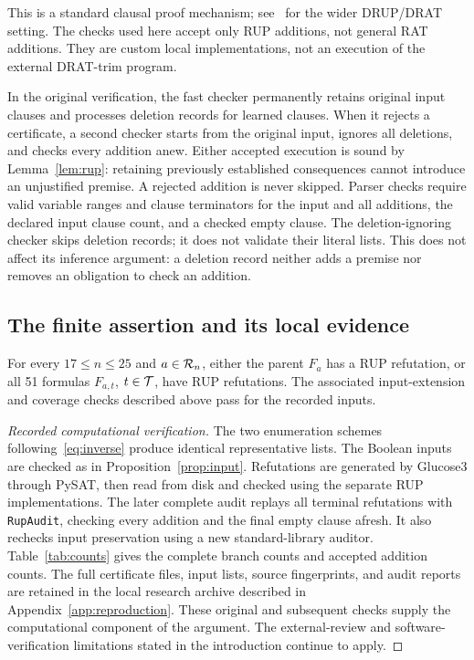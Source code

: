 This is a standard clausal proof mechanism; see~\cite{drat} for the wider
DRUP/DRAT setting. The checks used here accept only RUP additions, not
general RAT additions. They are custom local implementations, not an
execution of the external DRAT-trim program.

In the original verification, the fast checker permanently retains original input clauses and
processes deletion records for learned clauses. When it rejects a
certificate, a second checker starts from the original input, ignores all
deletions, and checks every addition anew. Either accepted execution is
sound by Lemma~\ref{lem:rup}: retaining previously established consequences
cannot introduce an unjustified premise. A rejected addition is never
skipped. Parser checks require valid variable ranges and clause terminators for
the input and all additions, the declared input clause count, and a
checked empty clause. The deletion-ignoring checker skips deletion records;
it does not validate their literal lists. This does not affect its
inference argument: a deletion record neither adds a premise nor removes
an obligation to check an addition.

\subsection{The finite assertion and its local evidence}
\begin{proposition}\label{prop:finite}
For every $17\leq n\leq25$ and $a\in\mathcal{R}_n$, either the parent
$F_a$ has a RUP refutation, or all 51 formulas $F_{a,t}$, $t\in\mathcal{T}$,
have RUP refutations. The associated input-extension and coverage checks
described above pass for the recorded inputs.
\end{proposition}

\begin{proof}[Recorded computational verification]
The two enumeration schemes following~\eqref{eq:inverse} produce identical
representative lists. The Boolean inputs are checked as in
Proposition~\ref{prop:input}. Refutations are generated by Glucose3
through PySAT, then read from disk and checked using the separate RUP
implementations. The later complete audit replays all terminal refutations
with \texttt{RupAudit}, checking every addition and the final empty
clause afresh. It also rechecks input preservation using a new
standard-library auditor. Table~\ref{tab:counts} gives the complete
branch counts and accepted addition counts. The full certificate files,
input lists, source fingerprints, and audit reports are retained in the
local research archive described in Appendix~\ref{app:reproduction}.
These original and subsequent checks supply the computational component
of the argument. The external-review and software-verification limitations
stated in the introduction continue to apply.
\end{proof}

